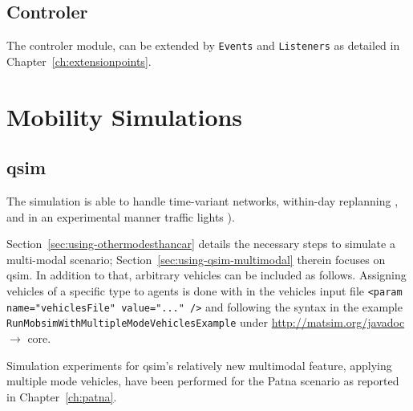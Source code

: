 \subsection{Controler}
\label{sec:extending-controler}
The controler module, can be extended by \lstinline|Events| and \lstinline|Listeners| as detailed in Chapter~\ref{ch:extensionpoints}. 
%


\section{Mobility Simulations}
\label{sec:extending-mobsims}
\subsection{\protect\gls{qsim}}
\label{sec:extending-qsim}
The simulation is able to handle time-variant networks, within-day replanning \citep[][]{Dobler_TechRep_IVT_2009}, and in an experimental manner traffic lights \citep[][]{Neumann_MastersThesis_2008}).

Section~\ref{sec:using-othermodesthancar} details the necessary steps to simulate a multi-modal scenario; Section~\ref{sec:using-qsim-multimodal} therein focuses on \gls{qsim}. 
In addition to that, arbitrary vehicles can be included as follows. 
Assigning vehicles of a specific type to agents is done with in the vehicles input file \lstinline|<param name="vehiclesFile" value="..." />| and following the syntax in the example \lstinline{RunMobsimWithMultipleModeVehiclesExample} under \url{http://matsim.org/javadoc} $\to$ core.

Simulation experiments for \gls{qsim}'s relatively new \gls{multimodal} feature, applying multiple mode vehicles, have been performed for the Patna scenario as reported in Chapter~\ref{ch:patna}.

